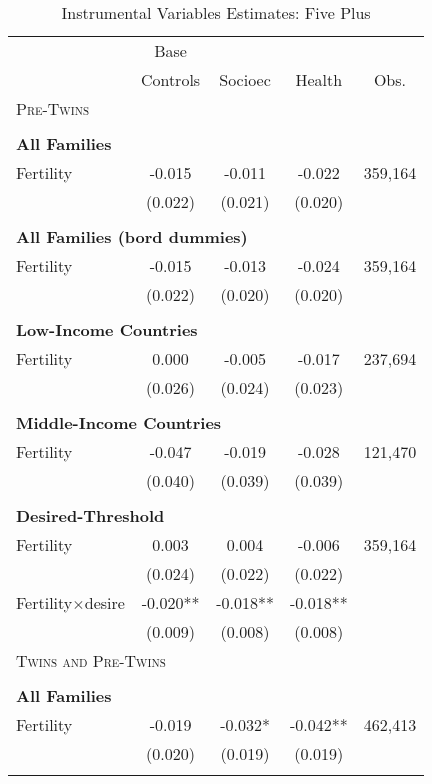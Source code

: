 \begin{table}[!htbp] \centering 
\caption{Instrumental Variables Estimates: Five Plus} \vspace{4mm} 
\label{TWINtab:IVFiveplus} 
\begin{tabular}{lcccc} \toprule \toprule 
&Base&&&\\
&Controls&Socioec&Health&Obs.\\\midrule
\multicolumn{5}{l}{\textsc{Pre-Twins}}\\ 
&&&&\\
\multicolumn{5}{l}{\textbf{All Families}}\\ 
Fertility&-0.015&-0.011&-0.022&359,164\\
         &(0.022)&(0.021)&(0.020)&\\
&&&&\\
\multicolumn{5}{l}{\textbf{All Families (bord dummies)}}\\ 
Fertility&-0.015&-0.013&-0.024&359,164\\
         &(0.022)&(0.020)&(0.020)&\\
&&&&\\
\multicolumn{5}{l}{\textbf{Low-Income Countries}}\\ 
Fertility&0.000&-0.005&-0.017&237,694\\
         &(0.026)&(0.024)&(0.023)&\\
&&&&\\
\multicolumn{5}{l}{\textbf{Middle-Income Countries}}\\ 
Fertility&-0.047&-0.019&-0.028&121,470\\
         &(0.040)&(0.039)&(0.039)&\\
&&&&\\
\multicolumn{5}{l}{\textbf{Desired-Threshold}}\\ 
Fertility&0.003&0.004&-0.006&359,164\\
         &(0.024)&(0.022)&(0.022)&\\
Fertility$\times$desire&-0.020**&-0.018**&-0.018**&\\
         &(0.009)&(0.008)&(0.008)&\\
\midrule\multicolumn{5}{l}{\textsc{Twins and Pre-Twins}}\\ 
&&&&\\
\multicolumn{5}{l}{\textbf{All Families}}\\ 
Fertility&-0.019&-0.032*&-0.042**&462,413\\
         &(0.020)&(0.019)&(0.019)&\\
&&&&\\

\end{tabular}
\end{table}
